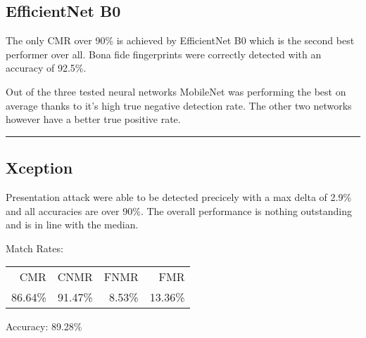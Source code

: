 \subsection{EfficientNet B0}

The only CMR over 90\% is achieved by EfficientNet B0 which is the second best performer over all.
Bona fide fingerprints were correctly detected with an accuracy of 92.5\%.
    




\medskip
Out of the three tested neural networks MobileNet was performing the best on average thanks to it's high true negative detection rate.
The other two networks however have a better true positive rate.
\bigskip\hrule



\subsection{Xception}
\begin{minipage}[c]{0.7\textwidth}
    Presentation attack were able to be detected precicely with a max delta of 2.9\% and all accuracies are over 90\%.
    The overall performance is nothing outstanding and is in line with the median.

    \medskip\centering Match Rates: 
    \begin{tabular}{ r  r  r  r |}
        CMR       & CNMR      & FNMR     & FMR     \\
        86.64\%   & 91.47\%   & 8.53\%   & 13.36\%  \\
    \end{tabular} \hspace{2mm} Accuracy: 89.28\%
\end{minipage}
\hfill
\begin{minipage}[c]{0.3\textwidth}
    \centering
    
\end{minipage}



